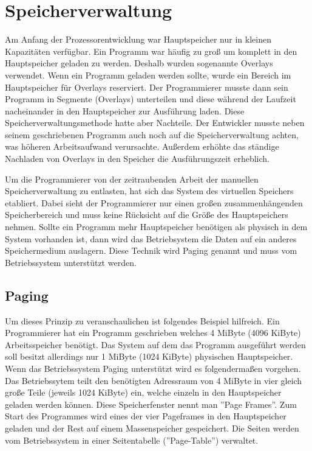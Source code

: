 \documentclass[12pt]{article}
\begin{document}
\section{Speicherverwaltung}
Am Anfang der Prozessorentwicklung war Hauptspeicher nur in kleinen Kapazitäten verfügbar. Ein Programm war häufig zu groß um komplett in den Hauptspeicher geladen zu werden. Deshalb wurden sogenannte Overlays verwendet. Wenn ein Programm geladen werden sollte, wurde ein Bereich im Hauptspeicher für Overlays reserviert. Der Programmierer musste dann sein Programm in Segmente (Overlays) unterteilen und diese während der Laufzeit nacheinander in den Hauptspeicher zur Ausführung laden. Diese Speicherverwaltungsmethode hatte aber Nachteile. Der Entwickler musste neben seinem geschriebenen Programm auch noch auf die Speicherverwaltung achten, was höheren Arbeitsaufwand verursachte. Außerdem erhöhte das ständige Nachladen von Overlays in den Speicher die Ausführungszeit erheblich. \cite[S.173]{mikroprozessortechnik2011}


Um die Programmierer von der zeitraubenden Arbeit der manuellen Speicherverwaltung zu entlasten, hat sich das System des virtuellen Speichers etabliert. Dabei sieht der Programmierer nur einen großen zusammenhängenden Speicherbereich und muss keine Rücksicht auf die Größe des Hauptspeichers nehmen. Sollte ein Programm mehr Hauptspeicher benötigen als physisch in dem System vorhanden ist, dann wird das Betriebsystem die Daten auf ein anderes Speichermedium auslagern. Diese Technik wird Paging genannt und muss vom Betriebssystem unterstützt werden.

\subsection{Paging}
Um dieses Prinzip zu veranschaulichen ist folgendes Beispiel hilfreich. Ein Programmierer hat ein Programm geschrieben welches 4 MiByte (4096 KiByte) Arbeitsspeicher benötigt. Das System auf dem das Programm ausgeführt werden soll besitzt allerdings nur 1 MiByte (1024 KiByte) physischen Hauptspeicher. Wenn das Betriebssystem Paging unterstützt wird es folgendermaßen vorgehen. Das Betriebssytem teilt den benötigten Adressraum von 4 MiByte in vier gleich große Teile (jeweils 1024 KiByte) ein, welche einzeln in den Hauptspeicher geladen werden können. Diese Speicherfenster nennt man ''Page Frames''. Zum Start des Programmes wird eines der vier Pageframes in den Hauptspeicher geladen und der Rest auf einem Massenspeicher gespeichert. Die Seiten werden vom Betriebssystem in einer Seitentabelle (''Page-Table'') verwaltet. 
\end{document}

